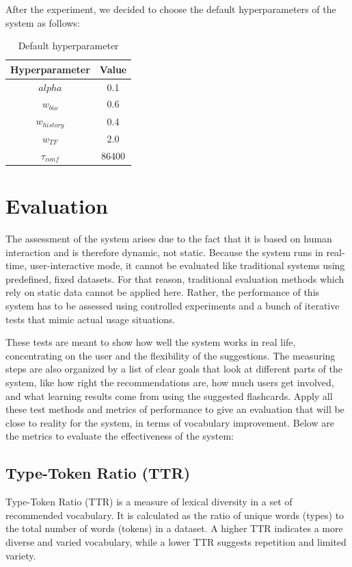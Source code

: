 \documentclass{article}
\begin{document}
After the experiment, we decided to choose the default hyperparameters of the system as follows:

\begin{table}[H]
\centering
\begin{tabular}{c|c}
Hyperparameter& Value\\
\hline
$alpha$ & 0.1 \\
$w_{bio}$ & 0.6 \\
$w_{history}$ & 0.4 \\
$w_{TF}$ & 2.0 \\
$\tau_{conf}$ & 86400 \\

\end{tabular}
\caption{Default hyperparameter}
\label{table:hyperparameter}
\end{table}

\section{Evaluation}
The assessment of the system arises due to the fact that it is based on human interaction and is therefore dynamic, not static. Because the system runs in real-time, user-interactive mode, it cannot be evaluated like traditional systems using predefined, fixed datasets. For that reason, traditional evaluation methods which rely on static data cannot be applied here. Rather, the performance of this system has to be assessed using controlled experiments and a bunch of iterative tests that mimic actual usage situations. 

These tests are meant to show how well the system works in real life, concentrating on the user and the flexibility of the suggestions. The measuring steps are also organized by a list of clear goals that look at different parts of the system, like how right the recommendations are, how much users get involved, and what learning results come from using the suggested flashcards. Apply all these test methods and metrics of performance to give an evaluation that will be close to reality for the system, in terms of vocabulary improvement. Below are the metrics to evaluate the effectiveness of the system:

\subsection{Type-Token Ratio (TTR)}
\label{sec:TTR}
Type-Token Ratio (TTR) is a measure of lexical diversity in a set of recommended vocabulary. It is calculated as the ratio of unique words (types) to the total number of words (tokens) in a dataset. A higher TTR indicates a more diverse and varied vocabulary, while a lower TTR suggests repetition and limited variety.
\end{document}
